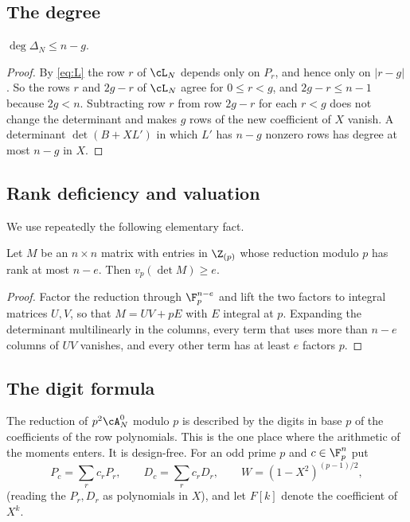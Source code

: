 \subsection{The degree}
\begin{lemma}\label{lem:degree}
$\deg\Delta_N\le n-g$.
\end{lemma}

\begin{proof}
By \eqref{eq:L} the row $r$ of $\cL_N$ depends only on $P_r$, and hence only on $|r-g|$. So the rows
$r$ and $2g-r$ of $\cL_N$ agree for $0\le r<g$, and $2g-r\le n-1$ because $2g<n$. Subtracting row $r$ from
row $2g-r$ for each $r<g$ does not change the determinant and makes $g$ rows of the new coefficient of
$X$ vanish. A determinant $\det(B+XL')$ in which $L'$ has $n-g$ nonzero rows has degree at most $n-g$ in $X$.
\end{proof}

\subsection{Rank deficiency and valuation}
We use repeatedly the following elementary fact.

\begin{lemma}\label{lem:rank-valuation}
Let $M$ be an $n\times n$ matrix with entries in $\Z_{(p)}$ whose reduction modulo $p$ has rank at most
$n-e$. Then $v_p(\det M)\ge e$.
\end{lemma}

\begin{proof}
Factor the reduction through $\F_p^{n-e}$ and lift the two factors to integral matrices $U,V$, so that
$M=UV+pE$ with $E$ integral at $p$. Expanding the determinant multilinearly in the columns, every term
that uses more than $n-e$ columns of $UV$ vanishes, and every other term has at least $e$ factors $p$.
\end{proof}

\subsection{The digit formula}
The reduction of $p^2\cA^0_N$ modulo $p$ is described by the digits in base $p$ of the coefficients of the
row polynomials. This is the one place where the arithmetic of the moments enters. It is design-free.
For an odd prime $p$ and $c\in\F_p^n$ put
\[
 P_c=\sum_rc_rP_r,\qquad D_c=\sum_rc_rD_r,\qquad W=(1-X^2)^{(p-1)/2},
\]
(reading the $P_r,D_r$ as polynomials in $X$), and let $F[k]$ denote the coefficient of $X^k$.


